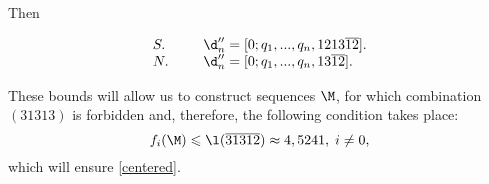 Then

\begin{equation*}
	\begin{array}{ll}
		S. & \hspace*{15pt} \d_n'' = [0; q_1, ..., q_n, 1213\overline{12}]. \\
		N. & \hspace*{15pt} \d_n'' = [0; q_1, ..., q_n, 13\overline{12}].
	\end{array}
\end{equation*}

These bounds will allow us to construct sequences $\M$,
for which combination $(31313)$ is forbidden and, therefore,
the following condition takes place:
\begin{equation*}
	f_i(\M) \leqslant \l(\overline{31312}) \approx 4,5241, \;
	i \ne 0,
\end{equation*}
which will ensure \ref{centered}.
